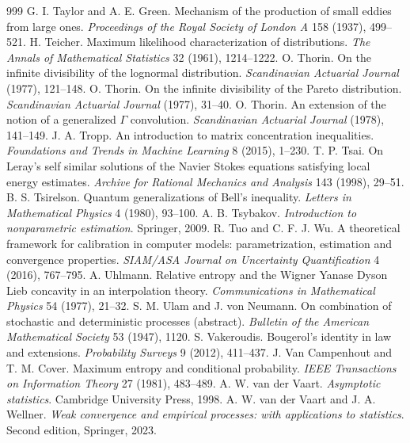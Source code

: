 \begin{thebibliography}{999}
 G. I. Taylor and A. E. Green. Mechanism of the production of small eddies from large ones. \emph{Proceedings of the Royal Society of London A} 158 (1937), 499--521.
 H. Teicher. Maximum likelihood characterization of distributions. \emph{The Annals of Mathematical Statistics} 32 (1961), 1214--1222.
 O. Thorin. On the infinite divisibility of the lognormal distribution. \emph{Scandinavian Actuarial Journal} (1977), 121--148.
 O. Thorin. On the infinite divisibility of the Pareto distribution. \emph{Scandinavian Actuarial Journal} (1977), 31--40.
 O. Thorin. An extension of the notion of a generalized $\Gamma$ convolution. \emph{Scandinavian Actuarial Journal} (1978), 141--149.
 J. A. Tropp. An introduction to matrix concentration inequalities. \emph{Foundations and Trends in Machine Learning} 8 (2015), 1--230.
 T. P. Tsai. On Leray's self similar solutions of the Navier Stokes equations satisfying local energy estimates. \emph{Archive for Rational Mechanics and Analysis} 143 (1998), 29--51.
 B. S. Tsirelson. Quantum generalizations of Bell's inequality. \emph{Letters in Mathematical Physics} 4 (1980), 93--100.
 A. B. Tsybakov. \emph{Introduction to nonparametric estimation}. Springer, 2009.
 R. Tuo and C. F. J. Wu. A theoretical framework for calibration in computer models: parametrization, estimation and convergence properties. \emph{SIAM/ASA Journal on Uncertainty Quantification} 4 (2016), 767--795.
 A. Uhlmann. Relative entropy and the Wigner Yanase Dyson Lieb concavity in an interpolation theory. \emph{Communications in Mathematical Physics} 54 (1977), 21--32.
 S. M. Ulam and J. von Neumann. On combination of stochastic and deterministic processes (abstract). \emph{Bulletin of the American Mathematical Society} 53 (1947), 1120.
 S. Vakeroudis. Bougerol's identity in law and extensions. \emph{Probability Surveys} 9 (2012), 411--437.
 J. Van Campenhout and T. M. Cover. Maximum entropy and conditional probability. \emph{IEEE Transactions on Information Theory} 27 (1981), 483--489.
 A. W. van der Vaart. \emph{Asymptotic statistics}. Cambridge University Press, 1998.
 A. W. van der Vaart and J. A. Wellner. \emph{Weak convergence and empirical processes: with applications to statistics}. Second edition, Springer, 2023.

\end{thebibliography}
